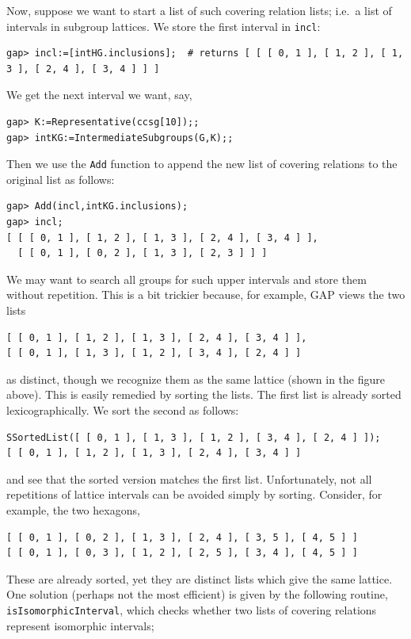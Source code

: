 \documentclass[11pt]{amsart}
\theoremstyle{plain}
\newcommand{\codesize}{\footnotesize}
\newcommand{\<}{\ensuremath{\langle}}
\renewcommand{\>}{\ensuremath{\rangle}}
\begin{document}
Now, suppose we want to start a list of such covering relation
lists; i.e.~a list of intervals in subgroup lattices. We store the first
interval in {\tt incl}:
{\codesize
\begin{verbatim}
gap> incl:=[intHG.inclusions];  # returns [ [ [ 0, 1 ], [ 1, 2 ], [ 1, 3 ], [ 2, 4 ], [ 3, 4 ] ] ]
\end{verbatim}}
\noindent We get the next interval we want, say,
{\codesize
\begin{verbatim}
gap> K:=Representative(ccsg[10]);;         
gap> intKG:=IntermediateSubgroups(G,K);;
\end{verbatim}}
\noindent Then we use the {\tt Add} function to append the new list of covering relations
to the original list as follows:
{\codesize
\begin{verbatim}
gap> Add(incl,intKG.inclusions);         
gap> incl;
[ [ [ 0, 1 ], [ 1, 2 ], [ 1, 3 ], [ 2, 4 ], [ 3, 4 ] ], 
  [ [ 0, 1 ], [ 0, 2 ], [ 1, 3 ], [ 2, 3 ] ] ]
\end{verbatim}}
\noindent We may want to search all groups for such upper intervals and store them without
repetition.  This is a bit trickier because, for example, GAP views the two lists
{\codesize
\begin{verbatim}
[ [ 0, 1 ], [ 1, 2 ], [ 1, 3 ], [ 2, 4 ], [ 3, 4 ] ],
[ [ 0, 1 ], [ 1, 3 ], [ 1, 2 ], [ 3, 4 ], [ 2, 4 ] ]
\end{verbatim}}
\noindent as distinct, though we recognize them as the same lattice
(shown in the figure above).  This is easily remedied by sorting the lists.  The
first list is already sorted lexicographically.  We sort the second as follows:
{\codesize
\begin{verbatim}
SSortedList([ [ 0, 1 ], [ 1, 3 ], [ 1, 2 ], [ 3, 4 ], [ 2, 4 ] ]);
[ [ 0, 1 ], [ 1, 2 ], [ 1, 3 ], [ 2, 4 ], [ 3, 4 ] ]
\end{verbatim}}
\noindent and see that the sorted version matches the first list.
Unfortunately, not all repetitions of lattice intervals can be avoided simply by
sorting. Consider, for example, the two hexagons,
{\codesize
\begin{verbatim}
[ [ 0, 1 ], [ 0, 2 ], [ 1, 3 ], [ 2, 4 ], [ 3, 5 ], [ 4, 5 ] ]
[ [ 0, 1 ], [ 0, 3 ], [ 1, 2 ], [ 2, 5 ], [ 3, 4 ], [ 4, 5 ] ]
\end{verbatim}}
\noindent These are already sorted, yet they are distinct lists which
give the same lattice.  One solution (perhaps not the most efficient)
is given by the following routine, {\tt isIsomorphicInterval}, which checks
whether two lists of covering relations represent isomorphic intervals;
\end{document}
